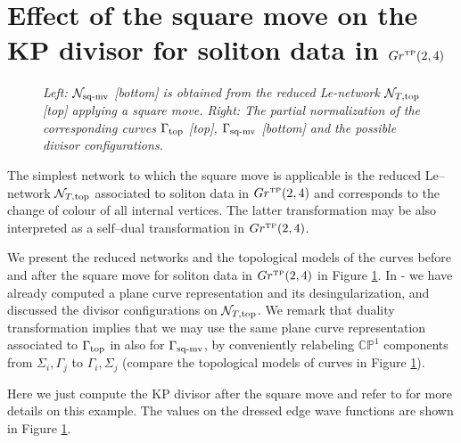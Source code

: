 \documentclass[11pt]{amsart}
\theoremstyle{plain}
\numberwithin{equation}{section}
\begin{document}
\section{Effect of the square move on the KP divisor for soliton data in $Gr^{\mbox{\tiny TP}}(2,4)$}\label{sec:ex_Gr24top}
\begin{figure}
\caption{\small{\sl Left: ${\mathcal N}_{\mbox{\scriptsize sq-mv}}$ [bottom] is obtained from the reduced Le-network ${\mathcal N}_{T,{\mbox{\scriptsize top}}}$ [top] applying a square move. Right: The partial normalization of the corresponding curves ${\Gamma}_{\mbox{\scriptsize top}}$ [top], ${\Gamma}_{\mbox{\scriptsize sq-mv}}$ [bottom] and the possible divisor configurations.}}
\label{fig:Gr24_square}
\end{figure}

The simplest network to which the square move is applicable is the reduced Le--network ${\mathcal N}_{T,{\mbox{\scriptsize top}}}$ associated to soliton data in $Gr^{\mbox{\tiny TP}} (2,4)$ and corresponds to the change of colour of all internal vertices. The latter transformation may be also interpreted as a self--dual transformation in $Gr^{\mbox{\tiny TP}} (2,4)$.

We present the reduced networks and the topological models of the curves before and after the square move for soliton data     in $Gr^{\mbox{\tiny TP}} (2,4)$ in Figure \ref{fig:Gr24_square}.
In \cite{A2}-\cite{AG3} we have already computed a plane curve representation and its desingularization, and discussed the divisor configurations on ${\mathcal N}_{T,{\mbox{\scriptsize top}}}$. We remark that duality transformation implies that we may use the same plane curve representation associated to ${\Gamma}_{\mbox{\scriptsize top}}$ in \cite{AG2} also for ${\Gamma}_{\mbox{\scriptsize sq-mv}}$, by conveniently relabeling $\mathbb{CP}^1$ components from $\Sigma_i,\Gamma_j$ to $\Gamma_i,\Sigma_j$ (compare the topological models of curves in Figure \ref{fig:Gr24_square}).

Here we just compute the KP divisor after the square move and refer to \cite{AG2} for more details on this example.
The values on the dressed edge wave functions are shown in Figure \ref{fig:Gr24_square}. 
\end{document}
